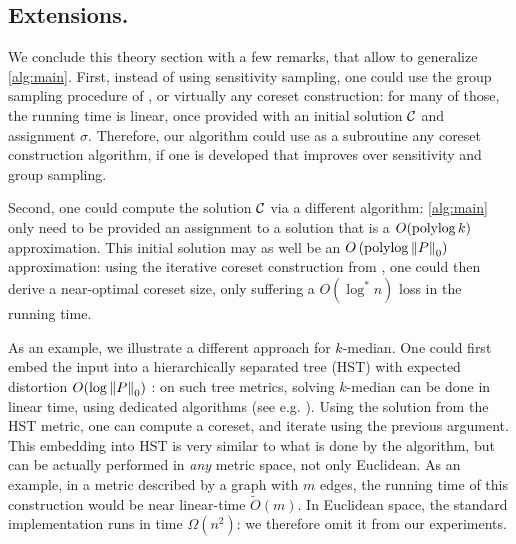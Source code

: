\subsection*{Extensions.} 
We conclude this theory section with a few remarks, that allow to generalize \cref{alg:main}.
First, instead of using sensitivity sampling, one could use the group sampling procedure of \cite{stoc21}, or virtually any coreset construction: for many of those, the running time is linear, once provided with an initial solution $\mathcal C$ and assignment $\sigma$. 
Therefore, our algorithm could use as a subroutine any coreset construction algorithm, if one is developed that improves over sensitivity and group sampling.

Second, one could compute the solution $\mathcal C$ via a different algorithm: \cref{alg:main} only need to be provided an assignment to a solution that is a $O(\operatorname{polylog} k)$ approximation. 
This initial solution may as well be an $O\left(\operatorname{polylog} \left\| P \right\|_0 \right)$ approximation: using the iterative coreset construction from \cite{BravermanJKW21}, one could then derive a near-optimal coreset size, only suffering a $O(\log^* n)$ loss in the running time.

As an example, we illustrate a different approach for $k$-median. One could first embed the input into a hierarchically separated tree (HST) with expected distortion $O(\log \left\| P \right\|_0)$ \cite{FakcharoenpholRT03}: on such tree metrics, solving $k$-median can be done in linear time, using dedicated algorithms (see e.g. \cite{Cohen-AddadLNSS21}). Using the solution from the HST metric, one can compute a coreset, and iterate using the previous argument.
This embedding into HST is very similar to what is done by the \fkmeans algorithm, but can be actually performed in \emph{any} metric space, not only Euclidean. 
As an example, in a metric described by a graph with $m$ edges, the running time of this construction would be near linear-time $\tilde O(m)$. In Euclidean space, the standard implementation runs in time $\Omega(n^2)$: we therefore omit it from our experiments.
